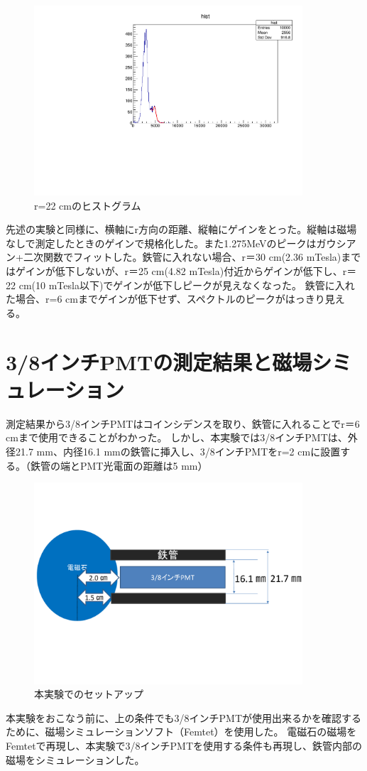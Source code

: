 \begin{figure}[H]
	\centering
		\includegraphics[angle=-90,width=10cm]{fig/iguchi/minicoout22.pdf}
	\caption{r=22 cmのヒストグラム}
	\label{histminicoout22}
\end{figure}
先述の実験と同様に、横軸にr方向の距離、縦軸にゲインをとった。縦軸は磁場なしで測定したときのゲインで規格化した。また1.275MeVのピークはガウシアン+二次関数でフィットした。鉄管に入れない場合、r＝30 cm(2.36 mTesla)まではゲインが低下しないが、r＝25 cm(4.82 mTesla)付近からゲインが低下し、r＝22 cm(10 mTesla以下)でゲインが低下しピークが見えなくなった。
鉄管に入れた場合、r=6 cmまでゲインが低下せず、スペクトルのピークがはっきり見える。


\section{3/8インチPMTの測定結果と磁場シミュレーション}
測定結果から3/8インチPMTはコインシデンスを取り、鉄管に入れることでr＝6 cmまで使用できることがわかった。
しかし、本実験では3/8インチPMTは、外径21.7 mm、内径16.1 mmの鉄管に挿入し、3/8インチPMTをr=2 cmに設置する。（鉄管の端とPMT光電面の距離は5 mm）
\begin{figure}[H]
	\centering
		\includegraphics[width=10cm]{fig/iguchi/honjikken.pdf}
	\caption{本実験でのセットアップ}
	\label{honjikken}
\end{figure}
本実験をおこなう前に、上の条件でも3/8インチPMTが使用出来るかを確認するために、磁場シミュレーションソフト（Femtet）を使用した。
電磁石の磁場をFemtetで再現し、本実験で3/8インチPMTを使用する条件も再現し、鉄管内部の磁場をシミュレーションした。

